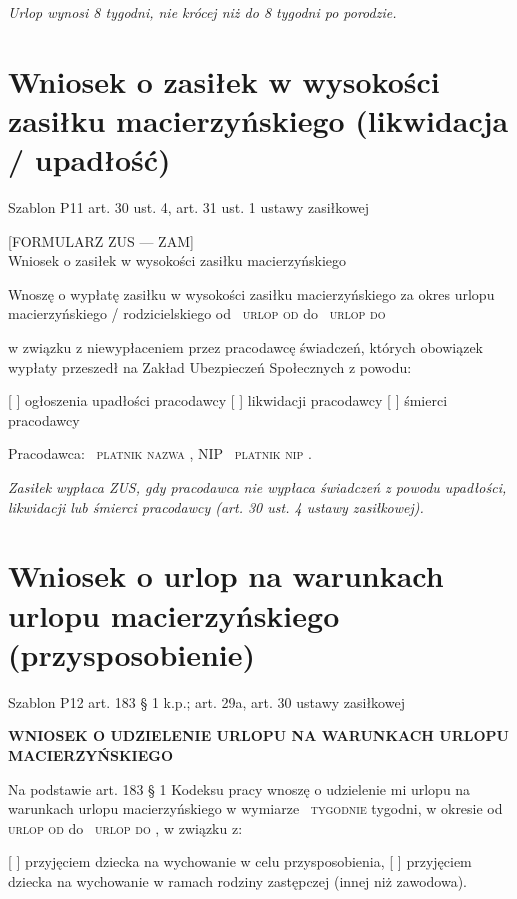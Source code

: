 \documentclass[11pt,a4paper]{article}
\newcommand{\Pole}[1]{%
  \textcolor{szary}{\dotfill}\,%
  {\scriptsize\textcolor{szary}{\textsc{#1}}}%
}
\newcommand{\NaglowekPisma}[1]{%
  \par\vspace{0.8em}%
  \begin{center}%
    {\large\bfseries\MakeUppercase{#1}}%
  \end{center}%
  \vspace{0.4em}%
}
\begin{document}
\vfill
{\footnotesize\color{szary}\itshape Urlop wynosi 8 tygodni, nie krócej niż do 8 tygodni po porodzie.}

\clearpage

\section{Wniosek o zasiłek w wysokości zasiłku macierzyńskiego (likwidacja / upadłość)}

{\small\color{szary}Szablon P11 \textbullet{} art. 30 ust. 4, art. 31 ust. 1 ustawy zasiłkowej}

[FORMULARZ ZUS --- ZAM]\\[-2pt]
Wniosek o zasiłek w wysokości zasiłku macierzyńskiego

Wnoszę o wypłatę zasiłku w wysokości zasiłku macierzyńskiego za okres
urlopu macierzyńskiego / rodzicielskiego od \Pole{urlop od} do \Pole{urlop do}
w związku z niewypłaceniem przez pracodawcę świadczeń, których obowiązek
wypłaty przeszedł na Zakład Ubezpieczeń Społecznych z powodu:

[ ] ogłoszenia upadłości pracodawcy
[ ] likwidacji pracodawcy
[ ] śmierci pracodawcy

Pracodawca: \Pole{platnik nazwa}, NIP \Pole{platnik nip}.

\vfill
{\footnotesize\color{szary}\itshape Zasiłek wypłaca ZUS, gdy pracodawca nie wypłaca świadczeń z powodu upadłości, likwidacji lub śmierci pracodawcy (art. 30 ust. 4 ustawy zasiłkowej). }

\clearpage

\section{Wniosek o urlop na warunkach urlopu macierzyńskiego (przysposobienie)}

{\small\color{szary}Szablon P12 \textbullet{} art. 183 \S{} 1 k.p.; art. 29a, art. 30 ustawy zasiłkowej}

\NaglowekPisma{WNIOSEK O UDZIELENIE URLOPU NA WARUNKACH URLOPU MACIERZYŃSKIEGO}

Na podstawie art. 183 \S{} 1 Kodeksu pracy wnoszę o udzielenie mi urlopu na
warunkach urlopu macierzyńskiego w wymiarze \Pole{tygodnie} tygodni, w okresie
od \Pole{urlop od} do \Pole{urlop do}, w związku z:

[ ] przyjęciem dziecka na wychowanie w celu przysposobienia,
[ ] przyjęciem dziecka na wychowanie w ramach rodziny zastępczej
(innej niż zawodowa).
\end{document}
